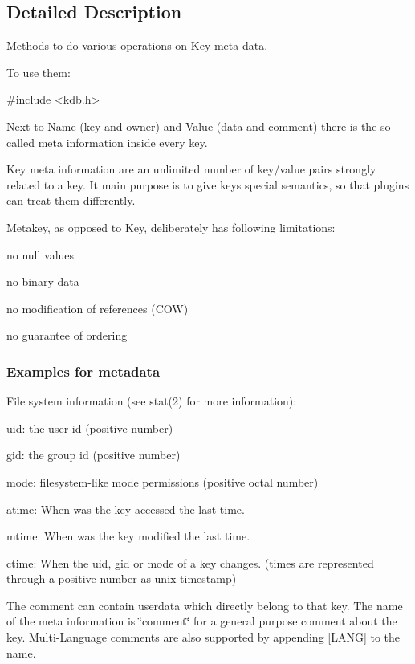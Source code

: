 \subsection{Detailed Description}
Methods to do various operations on Key meta data. 

To use them\+: 
\begin{DoxyCode}
\textcolor{preprocessor}{#include <kdb.h>}
\end{DoxyCode}


Next to \hyperlink{group__keyname}{Name (key and owner) } and \hyperlink{group__keyvalue}{Value (data and comment) } there is the so called meta information inside every key.

Key meta information are an unlimited number of key/value pairs strongly related to a key. It main purpose is to give keys special semantics, so that plugins can treat them differently.

Metakey, as opposed to Key, deliberately has following limitations\+:
\begin{DoxyItemize}
\item no null values
\item no binary data
\item no modification of references (C\+O\+W)
\item no guarantee of ordering
\end{DoxyItemize}

\subsubsection*{Examples for metadata}

File system information (see stat(2) for more information)\+:
\begin{DoxyItemize}
\item uid\+: the user id (positive number)
\item gid\+: the group id (positive number)
\item mode\+: filesystem-\/like mode permissions (positive octal number)
\item atime\+: When was the key accessed the last time.
\item mtime\+: When was the key modified the last time.
\item ctime\+: When the uid, gid or mode of a key changes. (times are represented through a positive number as unix timestamp)
\end{DoxyItemize}

The comment can contain userdata which directly belong to that key. The name of the meta information is \char`\"{}comment\char`\"{} for a general purpose comment about the key. Multi-\/\+Language comments are also supported by appending \mbox{[}L\+A\+N\+G\mbox{]} to the name.

